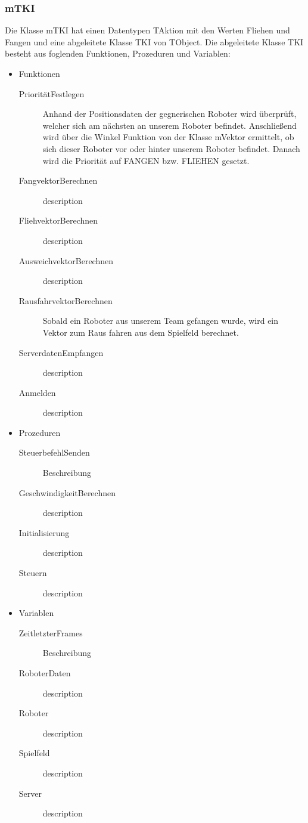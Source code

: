 \subsubsection{mTKI}
Die Klasse mTKI hat einen Datentypen TAktion mit den Werten Fliehen und Fangen und eine abgeleitete Klasse TKI von TObject.
Die abgeleitete Klasse TKI besteht aus foglenden Funktionen, Prozeduren und Variablen:
\begin{itemize}
	\item Funktionen
	\begin{description}
		\item[PrioritätFestlegen] Anhand der Positionsdaten der gegnerischen Roboter wird überprüft, welcher sich am nächsten an unserem
		Roboter befindet. Anschließend wird über die Winkel Funktion von der Klasse mVektor ermittelt, ob sich dieser Roboter vor oder hinter unserem Roboter befindet. Danach wird die Priorität auf FANGEN bzw. FLIEHEN gesetzt.
		\item[FangvektorBerechnen] description
		\item[FliehvektorBerechnen] description
		\item[AusweichvektorBerechnen] description
		\item[RausfahrvektorBerechnen] Sobald ein Roboter aus unserem Team gefangen wurde, wird ein Vektor zum Raus fahren aus dem Spielfeld berechnet.
		\item[ServerdatenEmpfangen] description
		\item[Anmelden] description
	\end{description}
	\item Prozeduren
	\begin{description}
		\item[SteuerbefehlSenden] Beschreibung
		\item[GeschwindigkeitBerechnen] description
		\item[Initialisierung] description
		\item[Steuern] description
	\end{description}
	\item Variablen
	\begin{description}
		\item[ZeitletzterFrames] Beschreibung
		\item[RoboterDaten] description
		\item[Roboter] description	
		\item[Spielfeld] description
		\item[Server] description	
	\end{description}
\end{itemize}

